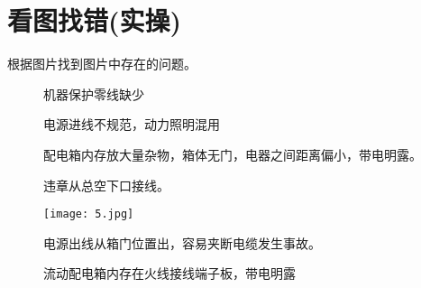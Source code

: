 \chapter{看图找错(实操)}

        \begin{center}
            根据图片找到图片中存在的问题。
        \end{center} 

		\begin{figure}[htbp]
			\centering
			\begin{minipage}{0.45\textwidth}
				\centering
				\caption*{\color{red}机器保护零线缺少}
			\end{minipage}                       \hspace{2em}
			\begin{minipage}{0.45\textwidth}
				\centering
				\caption*{电源进线不规范，动力照明混用}
			\end{minipage}
		\end{figure}
		\vspace*{1cm}
				

		\begin{figure}[htbp]
			\centering
			\begin{minipage}{0.45\textwidth}
				\centering
				\caption*{配电箱内存放大量杂物，箱体无门，电器之间距离偏小，带电明露。}
			\end{minipage}     \hspace{2em}
			\begin{minipage}{0.45\textwidth}
				\centering
				\caption*{违章从总空下口接线。}
			\end{minipage}
		\end{figure}
		\vspace*{1cm}	
				

		\begin{figure}[htbp]
			\centering
			\begin{minipage}{0.45\textwidth}
				\centering
				 {\texttt{[image: 5.jpg]}}                   %
				\caption*{电源出线从箱门位置出，容易夹断电缆发生事故。}
			\end{minipage}     \hspace{2em}
			\begin{minipage}{0.45\textwidth}
				\centering
				\caption*{流动配电箱内存在火线接线端子板，带电明露}
			\end{minipage}
		\end{figure}
		\vspace*{1cm}

